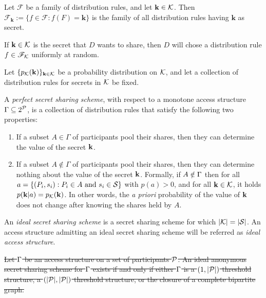  Let $\mathscr{F}$ be a family of distribution rules, and let $\mathbf{k} \in \mathcal{K}$. Then $\mathscr{F}_{\mathbf{k}} := \{ f \in \mathscr{F} : f(F) = \mathbf{k}\}$ is the family of all distribution rules having $\mathbf{k}$ as secret.

If $\mathbf{k} \in \mathcal{K}$ is the secret that $D$ wants to share, then $D$ will chose a distribution rule $f \in {\mathscr F}_{\mathcal{K}}$ uniformly at random.


Let $\{p_{\mathcal{K}} (\mathbf{k}) \}_{\mathbf{k} \in \mathcal{K}}$ be a probability distribution on $\mathcal{K}$, and let a collection of distribution rules for secrets in $\mathcal{K}$ be fixed.

 A \textit{perfect secret sharing scheme}, with respect to a monotone access structure $\Gamma \subseteq 2^{{\mathcal P}}$, is a collection of distribution rules that satisfy the following two properties:
\begin{enumerate}
    \item If a subset $A \in \Gamma$ of participants pool their shares, then they can determine the value of the secret $\mathbf{k}$.
    \item If a subset $A \notin \Gamma$ of participants pool their shares, then they can determine nothing about the value of the secret $\mathbf{k}$. Formally, if $A \notin \Gamma$ then for all $a = \{ (P_i, s_i): P_i \in A \text{ and } s_i \in \mathcal{S} \}$ with $p(a)>0$, and for all $\mathbf{k} \in \mathcal{K}$, it holds $p(\mathbf{k} \vert a) = p_{\mathcal{K}}(\mathbf{k})$. In other words, the \textit{a priori} probability of the value of $\mathbf{k}$ does not change after knowing the shares held by $A$.
\end{enumerate}

 An \textit{ideal secret sharing scheme} is a secret sharing scheme for which $\vert \mathcal{K} \vert = \vert \mathcal{S} \vert$. An access structure admitting an ideal secret sharing scheme will be referred as \textit{ideal access structure}.

\thm \sout{Let $\Gamma$ be an access structure on a set of participants ${\mathcal P}$. An ideal anonymous secret sharing scheme for $\Gamma$ exists if and only if either $\Gamma$ is a $(1,\vert {\mathcal P} \vert)$ threshold structure, a $(\vert {\mathcal P} \vert, \vert {\mathcal P} \vert)$ threshold structure, or the closure of a complete bipartite graph.}
